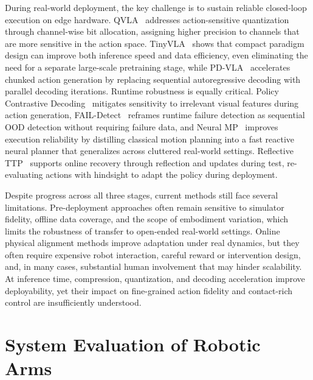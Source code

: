 \documentclass[acmsmall,screen,review]{acmart}
\begin{document}
During real-world deployment, the key challenge is to sustain reliable closed-loop execution on edge hardware.
QVLA~\cite{xu2026qvla} addresses action-sensitive quantization through channel-wise bit allocation, assigning higher precision to channels that are more sensitive in the action space. 
TinyVLA~\cite{wen2025tinyvla} shows that compact paradigm design can improve both inference speed and data efficiency, even eliminating the need for a separate large-scale pretraining stage, while PD-VLA~\cite{pdvla2025} accelerates chunked action generation by replacing sequential autoregressive decoding with parallel decoding iterations.
Runtime robustness is equally critical. 
Policy Contrastive Decoding~\cite{wu2026policycontrastive} mitigates sensitivity to irrelevant visual features during action generation, 
FAIL-Detect~\cite{xu2025detectfailures} reframes runtime failure detection as sequential OOD detection without requiring failure data, and Neural MP~\cite{dalal2024neuralmp} improves execution reliability by distilling classical motion planning into a fast reactive neural planner that generalizes across cluttered real-world settings. Reflective TTP~\cite{hong2026rttp} supports online recovery through reflection and updates during test, re-evaluating actions with hindsight to adapt the policy during deployment.

Despite progress across all three stages, current methods still face several limitations. 
Pre-deployment approaches often remain sensitive to simulator fidelity, offline data coverage, and the scope of embodiment variation, which limits the robustness of transfer to open-ended real-world settings. 
Online physical alignment methods improve adaptation under real dynamics, but they often require expensive robot interaction, careful reward or intervention design, and, in many cases, substantial human involvement that may hinder scalability. 
At inference time, compression, quantization, and decoding acceleration improve deployability, yet their impact on fine-grained action fidelity and contact-rich control are insufficiently understood.

\section{System Evaluation of Robotic Arms}\label{sec:evaluation}
\end{document}
